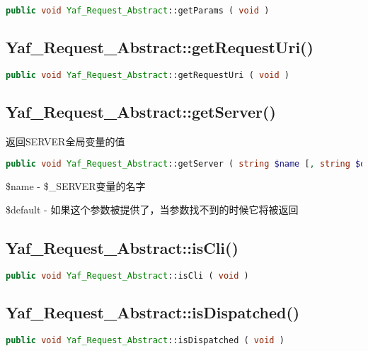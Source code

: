 \begin{lstlisting}[language=PHP]
public void Yaf_Request_Abstract::getParams ( void )
\end{lstlisting}



\subsection{Yaf\_Request\_Abstract::getRequestUri()}




\begin{lstlisting}[language=PHP]
public void Yaf_Request_Abstract::getRequestUri ( void )
\end{lstlisting}



\subsection{Yaf\_Request\_Abstract::getServer()}

返回SERVER全局变量的值

\begin{lstlisting}[language=PHP]
public void Yaf_Request_Abstract::getServer ( string $name [, string $default ] )
\end{lstlisting}

\begin{compactitem}
\item \$name - \$\_SERVER变量的名字
\item \$default - 如果这个参数被提供了，当参数找不到的时候它将被返回
\end{compactitem}

\subsection{Yaf\_Request\_Abstract::isCli()}




\begin{lstlisting}[language=PHP]
public void Yaf_Request_Abstract::isCli ( void )
\end{lstlisting}



\subsection{Yaf\_Request\_Abstract::isDispatched()}




\begin{lstlisting}[language=PHP]
public void Yaf_Request_Abstract::isDispatched ( void )
\end{lstlisting}


